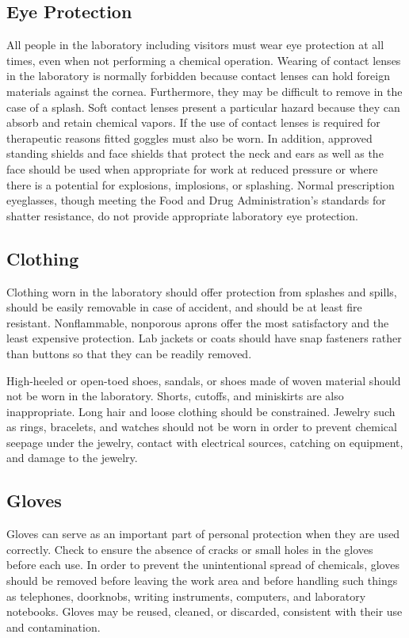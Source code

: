 \documentclass[letterpaper,10pt,english]{sphinxmanual}
\begin{document}
\subsection{Eye Protection}
\label{\detokenize{Laboratory_Safety/Laboratory_Safety:eye-protection}}
All people in the laboratory including visitors must wear eye protection at all times, even when not performing a chemical operation. Wearing of contact lenses in the laboratory is normally forbidden because contact lenses can hold foreign materials against the cornea. Furthermore, they may be difficult to remove in the case of a splash. Soft contact lenses present a particular hazard because they can absorb and retain chemical vapors. If the use of contact lenses is required for therapeutic reasons fitted goggles must also be worn. In addition, approved standing shields and face shields that protect the neck and ears as well as the face should be used when appropriate for work at reduced pressure or where there is a potential for explosions, implosions, or splashing. Normal prescription eyeglasses, though meeting the Food and Drug Administration’s standards for shatter resistance, do not provide appropriate laboratory eye protection.


\subsection{Clothing}
\label{\detokenize{Laboratory_Safety/Laboratory_Safety:clothing}}
Clothing worn in the laboratory should offer protection from splashes and spills, should be easily removable in case of accident, and should be at least fire resistant. Nonflammable, nonporous aprons offer the most satisfactory and the least expensive protection. Lab jackets or coats should have snap fasteners rather than buttons so that they can be readily removed.

High-heeled or open-toed shoes, sandals, or shoes made of woven material should not be worn in the laboratory. Shorts, cutoffs, and miniskirts are also inappropriate. Long hair and loose clothing should be constrained. Jewelry such as rings, bracelets, and watches should not be worn in order to prevent chemical seepage under the jewelry, contact with electrical sources, catching on equipment, and damage to the jewelry.


\subsection{Gloves}
\label{\detokenize{Laboratory_Safety/Laboratory_Safety:gloves}}
Gloves can serve as an important part of personal protection when they are used correctly. Check to ensure the absence of cracks or small holes in the gloves before each use. In order to prevent the unintentional spread of chemicals, gloves should be removed before leaving the work area and before handling such things as telephones, doorknobs, writing instruments, computers, and laboratory notebooks. Gloves may be reused, cleaned, or discarded, consistent with their use and contamination.
\end{document}
